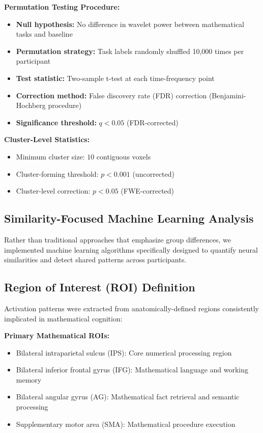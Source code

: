 \documentclass[12pt, a4paper]{article}
\begin{document}
\vspace{0.5\baselineskip}
\noindent
\textbf{Permutation Testing Procedure:}
\begin{itemize}
\item \textbf{Null hypothesis:} No difference in wavelet power between mathematical tasks and baseline
\item \textbf{Permutation strategy:} Task labels randomly shuffled 10,000 times per participant
\item \textbf{Test statistic:} Two-sample t-test at each time-frequency point
\item \textbf{Correction method:} False discovery rate (FDR) correction (Benjamini-Hochberg procedure)
\item \textbf{Significance threshold:} $q < 0.05$ (FDR-corrected)
\end{itemize}

\noindent
\textbf{Cluster-Level Statistics:}
\begin{itemize}
\item Minimum cluster size: $10$ contiguous voxels
\item Cluster-forming threshold: $p < 0.001$ (uncorrected)
\item Cluster-level correction: $p < 0.05$ (FWE-corrected)
\end{itemize}

\subsection{Similarity-Focused Machine Learning Analysis}
Rather than traditional approaches that emphasize group differences, we implemented machine learning algorithms specifically designed to quantify neural similarities and detect shared patterns across participants.

\subsection{Region of Interest (ROI) Definition}
Activation patterns were extracted from anatomically-defined regions consistently implicated in mathematical cognition:

\vspace{0.5\baselineskip}
\noindent
\textbf{Primary Mathematical ROIs:}
\begin{itemize}
\item Bilateral intraparietal sulcus (IPS): Core numerical processing region
\item Bilateral inferior frontal gyrus (IFG): Mathematical language and working memory
\item Bilateral angular gyrus (AG): Mathematical fact retrieval and semantic processing
\item Supplementary motor area (SMA): Mathematical procedure execution
\end{itemize}
\end{document}

